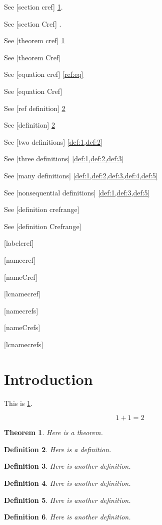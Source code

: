 \documentclass{amsart}
\newtheorem{theorem}{Theorem}
\newtheorem{definition}[theorem]{Definition}
\begin{document}

See [section cref] \cref{sec:intro}.

See [section Cref] .

See [theorem cref] \cref{thm:1}

See [theorem Cref] 

See [equation cref] \cref{ref:eq}

See [equation Cref] 

See [ref definition] \ref{def:1}

See [definition] \cref{def:1}

See [two definitions] \cref{def:1,def:2}

See [three definitions] \cref{def:1,def:2,def:3}

See [many definitions] \cref{def:1,def:2,def:3,def:4,def:5}

See [nonsequential definitions] \cref{def:1,def:3,def:5}

See [definition crefrange] 

See [definition Crefrange] 

[labelcref] 

[namecref] 

[nameCref] 

[lcnamecref] 

[namecrefs] 

[nameCrefs] 

[lcnamecrefs] 

\section{Introduction}
\label{sec:intro}

This is \cref{sec:intro}.

\begin{equation}
\label{ref:eq}
1 + 1 = 2
\end{equation}

\begin{theorem}\label{thm:1}
Here is a theorem.
\end{theorem}

\begin{definition}
\label{def:1}
Here is a definition.
\end{definition}

\begin{definition}
\label{def:2}
Here is another definition.
\end{definition}

\begin{definition}
\label{def:3}
Here is another definition.
\end{definition}

\begin{definition}
\label{def:4}
Here is another definition.
\end{definition}

\begin{definition}
\label{def:5}
Here is another definition.
\end{definition}
\end{document}
